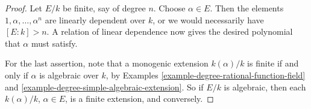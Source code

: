 \documentclass[10pt,a4paper]{amsart}
\theoremstyle{plain}
\theoremstyle{definition}
\theoremstyle{remark}
\numberwithin{equation}{subsection}
\begin{document}
\begin{proof}
Let $E/k$ be finite, say of degree $n$. Choose $\alpha \in E$. Then the
elements $1, \alpha, \ldots, \alpha^n$ are linearly
dependent over $k$, or we would necessarily have $[E : k] > n$. A relation of
linear dependence now gives the desired polynomial that $\alpha$ must satisfy.

\medskip\noindent
For the last assertion, note that a monogenic extension $k(\alpha)/k$ is
finite if and only if $\alpha$ is algebraic over $k$, by
Examples \ref{example-degree-rational-function-field} and
\ref{example-degree-simple-algebraic-extension}.
So if $E/k$ is algebraic, then each $k(\alpha)/k$, $\alpha \in E$, is a finite
extension, and conversely.
\end{proof}
\end{document}
